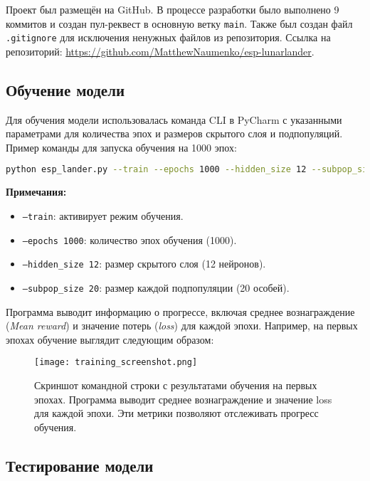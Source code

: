 \documentclass[a4paper,12pt]{article}
\begin{document}
Проект был размещён на GitHub. В процессе разработки было выполнено 9 коммитов и создан пул-реквест в основную ветку \texttt{main}. Также был создан файл \texttt{.gitignore} для исключения ненужных файлов из репозитория.  
Ссылка на репозиторий: \url{https://github.com/MatthewNaumenko/esp-lunarlander}.

\subsection{Обучение модели}

Для обучения модели использовалась команда CLI в PyCharm с указанными параметрами для количества эпох и размеров скрытого слоя и подпопуляций. Пример команды для запуска обучения на 1000 эпох:

\begin{lstlisting}[language=bash]
	python esp_lander.py --train --epochs 1000 --hidden_size 12 --subpop_size 20
\end{lstlisting}

\textbf{Примечания:}
\begin{itemize}
	\item \texttt{--train}: активирует режим обучения.
	\item \texttt{--epochs 1000}: количество эпох обучения (1000).
	\item \texttt{--hidden\_size 12}: размер скрытого слоя (12 нейронов).
	\item \texttt{--subpop\_size 20}: размер каждой подпопуляции (20 особей).
\end{itemize}

Программа выводит информацию о прогрессе, включая среднее вознаграждение (\textit{Mean reward}) и значение потерь (\textit{loss}) для каждой эпохи. Например, на первых эпохах обучение выглядит следующим образом:

\begin{figure}[H]
	\centering
	\texttt{[image: training\_screenshot.png]}
	\caption{Скриншот командной строки с результатами обучения на первых эпохах. Программа выводит среднее вознаграждение и значение loss для каждой эпохи. Эти метрики позволяют отслеживать прогресс обучения.}
	\label{fig:training_screenshot}
\end{figure}

\subsection{Тестирование модели}
\end{document}
